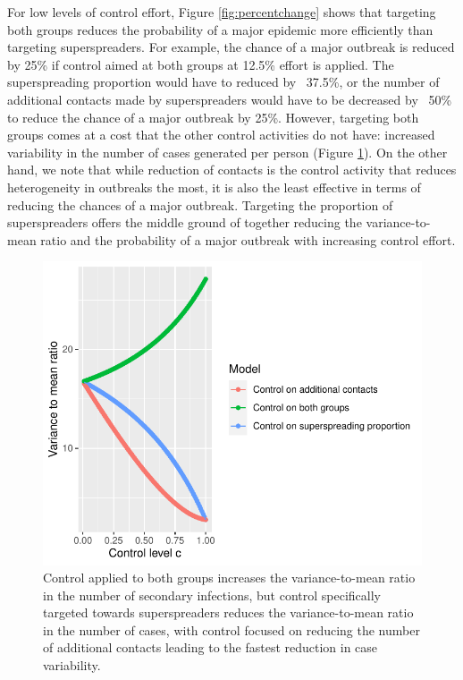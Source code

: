 \documentclass{imammb}
\numberwithin{equation}{section}
\begin{document}
For low levels of control effort, Figure \ref{fig:percentchange} shows that targeting both groups reduces the probability of a major epidemic more efficiently than targeting superspreaders. For example, the chance of a major outbreak is reduced by 25\% if control aimed at both groups at 12.5\% effort is applied. The superspreading proportion would have to reduced by ~37.5\%, or the number of additional contacts made by superspreaders would have to be decreased by ~50\% to reduce the chance of a major outbreak by 25\%.  However, targeting both groups comes at a cost that the other control activities do not have: increased variability in the number of cases generated per person (Figure \ref{fig:varmeanratio}). On the other hand, we note that while reduction of contacts is the control activity that reduces heterogeneity in outbreaks the most, it is also the least effective in terms of reducing the chances of a major outbreak. Targeting the proportion of superspreaders offers the middle ground of together reducing the variance-to-mean ratio and the probability of a major outbreak with increasing control effort. %



\begin{figure}
    \centering
    \includegraphics{Figure9.pdf}
    \caption{Control applied to both groups increases the variance-to-mean ratio in the number of secondary infections, but control specifically targeted towards superspreaders reduces the variance-to-mean ratio in the number of cases, with control focused on reducing the number of additional contacts leading to the fastest reduction in case variability. }
    \label{fig:varmeanratio}
\end{figure}
\end{document}
